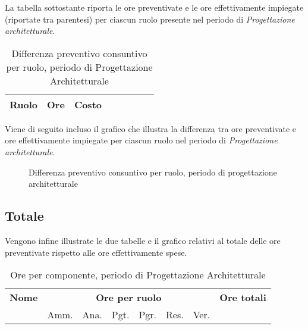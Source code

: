 La tabella sottostante riporta le ore preventivate e le ore effettivamente impiegate (riportate tra parentesi) per ciascun ruolo presente nel periodo di \textit{Progettazione architetturale}.

\begin{center}
\begin{table}[H]
\begin{tabular}{lccccccc}
\toprule
    \textbf{Ruolo}  & \textbf{Ore} & \textbf{Costo} \\
    \midrule
    
    	
    
    \bottomrule
\end{tabular}
\caption{Differenza preventivo consuntivo per ruolo, periodo di Progettazione Architetturale}
\end{table}
\end{center}

Viene di seguito incluso il grafico che illustra la differenza tra ore preventivate e ore effettivamente impiegate per ciascun ruolo nel periodo di \textit{Progettazione architetturale}.

\begin{center}
\begin{figure}[H]
\caption{Differenza preventivo consuntivo per ruolo, periodo di progettazione architetturale}
\end{figure}
\end{center}

\subsection{Totale}

Vengono infine illustrate le due tabelle e il grafico relativi al totale delle ore preventivate rispetto alle ore effettivamente spese.

\begin{center}
\begin{table}[H]
\begin{tabular}{lccccccc}
\toprule
    \textbf{Nome}  & \multicolumn{6}{c}{\textbf{Ore per ruolo}} & \textbf{Ore totali} \\
     & Amm. & Ana. & Pgt. & Pgr. & Res. & Ver. & \\
    \midrule
    
    	
    
    \bottomrule
\end{tabular}
\caption{Ore per componente, periodo di Progettazione Architetturale}
\end{table}
\end{center}

